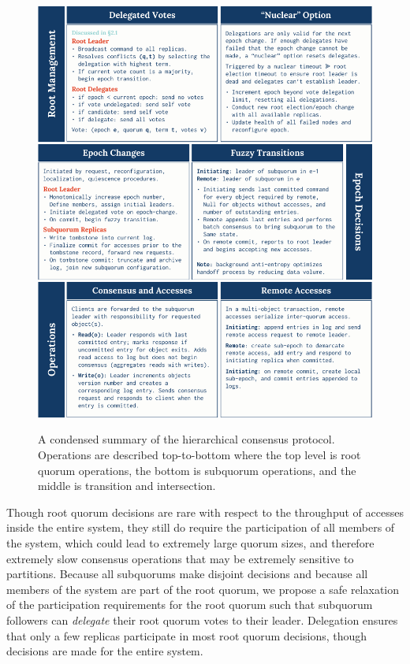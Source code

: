 \begin{figure}
    \begin{center}
        \includegraphics[width=5in]{figures/ch03_hc_operation_summary.pdf}
    \end{center}
    \renewcommand{\baselinestretch}{1}
    \small\normalsize

    \begin{quote}
        \caption[HC Operational Summary]{A condensed summary of the hierarchical consensus protocol. Operations are described top-to-bottom where the top level is root quorum operations, the bottom is subquorum operations, and the middle is transition and intersection.}
        \label{fig:ch03_hc_operation_summary}
    \end{quote}
\end{figure}
\renewcommand{\baselinestretch}{2}
\small\normalsize

Though root quorum decisions are rare with respect to the throughput of accesses inside the entire system, they still do require the participation of all members of the system, which could lead to extremely large quorum sizes, and therefore extremely slow consensus operations that may be extremely sensitive to partitions.
Because all subquorums make disjoint decisions and because all members of the system are part of the root quorum, we propose a safe relaxation of the participation requirements for the root quorum such that subquorum followers can \emph{delegate} their root quorum votes to their leader.
Delegation ensures that only a few replicas participate in most root quorum decisions, though decisions are made for the entire system.

